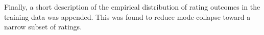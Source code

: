 Finally, a short description of the empirical distribution of rating outcomes in the training data was appended. This was found to reduce mode-collapse toward a narrow subset of ratings.


